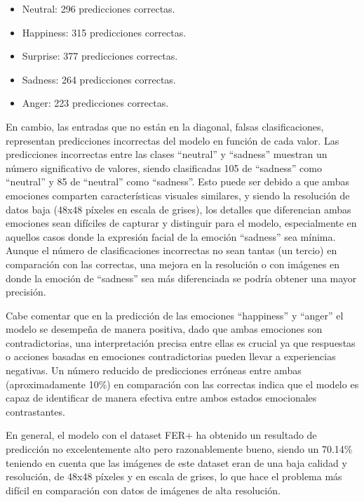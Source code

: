 \documentclass[12pt]{report} %
\begin{document}
\begin{itemize}

    \item Neutral: 296 predicciones correctas.
    \item Happiness: 315 predicciones correctas. 
    \item Surprise: 377 predicciones correctas. 
    \item Sadness: 264 predicciones correctas.
    \item Anger: 223 predicciones correctas. 

\end{itemize}

En cambio, las entradas que no están en la diagonal, falsas clasificaciones, representan predicciones incorrectas del modelo en función de cada valor. Las predicciones incorrectas entre las clases “neutral” y “sadness” muestran un número significativo de valores, siendo clasificadas 105 de “sadness” como “neutral” y 85 de “neutral” como “sadness”. Esto puede ser debido a que ambas emociones comparten características visuales similares, y siendo la resolución de datos baja (48x48 píxeles en escala de grises), los detalles que diferencian ambas emociones sean difíciles de capturar y distinguir para el modelo, especialmente en aquellos casos donde la expresión facial de la emoción “sadness” sea mínima. Aunque el número de clasificaciones incorrectas no sean tantas (un tercio) en comparación con las correctas, una mejora en la resolución o con imágenes en donde la emoción de “sadness” sea más diferenciada se podría obtener una mayor precisión.

Cabe comentar que en la predicción de las emociones “happiness” y “anger” el modelo se desempeña de manera positiva, dado que ambas emociones son contradictorias, una interpretación precisa entre ellas es crucial ya que respuestas o acciones basadas en emociones contradictorias pueden llevar a experiencias negativas. Un número reducido de predicciones erróneas entre ambas (aproximadamente 10\%) en comparación con las correctas indica que el modelo es capaz de identificar de manera efectiva entre ambos estados emocionales contrastantes.

En general, el modelo con el dataset FER+ ha obtenido un resultado de predicción no excelentemente alto pero razonablemente bueno, siendo un 70.14\% teniendo en cuenta que las imágenes de este dataset eran de una baja calidad y resolución, de 48x48 píxeles y en escala de grises, lo que hace el problema más difícil en comparación con datos de imágenes de alta resolución. 
\end{document}
